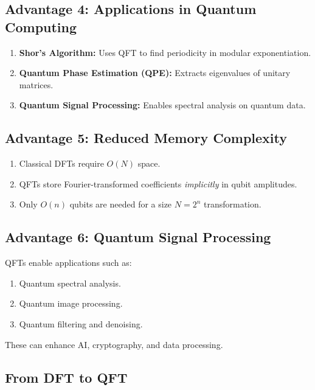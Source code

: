 \documentclass[%
oneside,                 %
final,                   %
10pt]{article}
\begin{document}
\noindent
\subsection{Advantage 4: Applications in Quantum Computing}
\begin{enumerate}
\item \textbf{Shor’s Algorithm:} Uses QFT to find periodicity in modular exponentiation.

\item \textbf{Quantum Phase Estimation (QPE):} Extracts eigenvalues of unitary matrices.

\item \textbf{Quantum Signal Processing:} Enables spectral analysis on quantum data.
\end{enumerate}

\noindent
\subsection{Advantage 5: Reduced Memory Complexity}

\begin{enumerate}
\item Classical DFTs require $O(N)$ space.

\item QFTs store Fourier-transformed coefficients \emph{implicitly} in qubit amplitudes.

\item Only $O(n)$ qubits are needed for a size $N = 2^n$ transformation.
\end{enumerate}

\noindent
\subsection{Advantage 6: Quantum Signal Processing}
QFTs enable applications such as:
\begin{enumerate}
\item Quantum spectral analysis.

\item Quantum image processing.

\item Quantum filtering and denoising.
\end{enumerate}

\noindent
These can enhance AI, cryptography, and data processing.

\subsection{From DFT to QFT}
\end{document}

